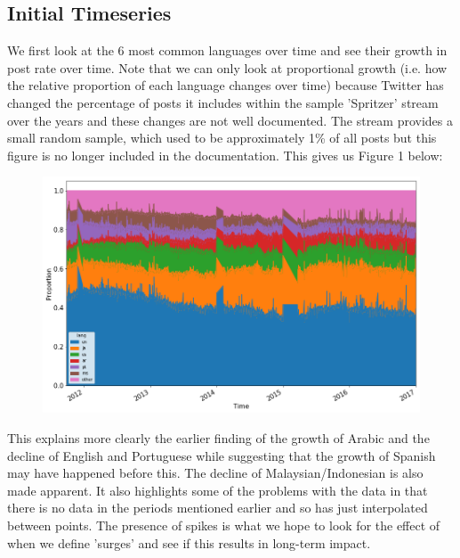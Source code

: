 \documentclass[12pt]{article}
\begin{document}
\subsection{Initial Timeseries}
We first look at the 6 most common languages over time and see their growth in post rate over time. Note that we can only look at proportional growth (i.e. how the relative proportion of each language changes over time) because Twitter has changed the percentage of posts it includes within the sample 'Spritzer' stream over the years and these changes are not well documented. The stream provides a small random sample, which used to be approximately 1\% of all posts but this figure is no longer included in the documentation. This gives us Figure 1 below:
\FloatBarrier
\begin{figure}[hbtp]\centering
\includegraphics[width=\textwidth,clip]{images/languageproportionplot.png}
\end{figure}
\FloatBarrier
This explains more clearly the earlier finding of the growth of Arabic and the decline of English and Portuguese while suggesting that the growth of Spanish may have happened before this. The decline of Malaysian/Indonesian is also made apparent. It also highlights some of the problems with the data in that there is no data in the periods mentioned earlier and so has just interpolated between points. The presence of spikes is what we hope to look for the effect of when we define 'surges' and see if this results in long-term impact.
\end{document}
